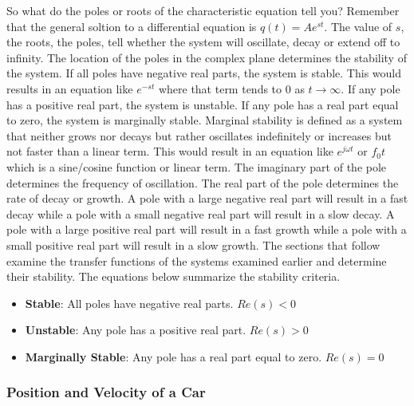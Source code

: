 So what do the poles or roots of the characteristic equation tell you? Remember that the general soltion to a differential equation is $q(t) = Ae^{st}$. The value of $s$, the roots, the poles, tell whether the system will oscillate, decay or extend off to infinity. The location of the poles in the complex plane determines the stability of the system. If all poles have negative real parts, the system is stable. This would results in an equation like $e^{-st}$ where that term tends to 0 as $t \rightarrow \infty$. If any pole has a positive real part, the system is unstable. If any pole has a real part equal to zero, the system is marginally stable. Marginal stability is defined as a system that neither grows nor decays but rather oscillates indefinitely or increases but not faster than a linear term. This would result in an equation like $e^{j\omega t}$  or $f_0 t$ which is a sine/cosine function or linear term. The imaginary part of the pole determines the frequency of oscillation. The real part of the pole determines the rate of decay or growth. A pole with a large negative real part will result in a fast decay while a pole with a small negative real part will result in a slow decay. A pole with a large positive real part will result in a fast growth while a pole with a small positive real part will result in a slow growth. The sections that follow examine the transfer functions of the systems examined earlier and determine their stability. The equations below summarize the stability criteria.
\begin{itemize}
    \item {\bf Stable}: All poles have negative real parts. $Re(s) < 0$
    \item {\bf Unstable}: Any pole has a positive real part. $Re(s) > 0$
    \item {\bf Marginally Stable}: Any pole has a real part equal to zero. $Re(s) = 0$
\end{itemize}

\subsubsection{Position and Velocity of a Car}

